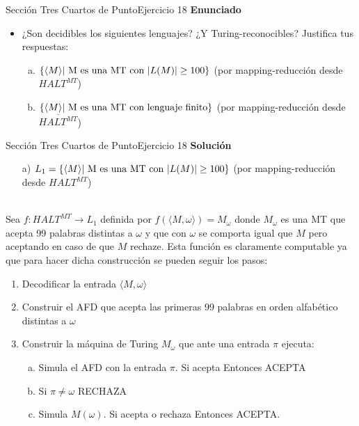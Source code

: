 \documentclass[10pt, envcountsect, presentation, aspectratio=169]{beamer}
\begin{document}

\begin{frame}{Sección Tres Cuartos de Punto}{Ejercicio 18}
    \textbf{Enunciado}
    \begin{itemize}
        \item ¿Son decidibles los siguientes lenguajes? ¿Y Turing-reconocibles? Justifica tus respuestas:
        \begin{enumerate}[a)]
            \item $\{\langle M \rangle \hbox{| M es una MT con } |L(M)| \geq 100\}$ (por mapping-reducción desde $HALT^{MT}$)
            \item $\{\langle M \rangle \hbox{| M es una MT con lenguaje finito}  \}$ (por mapping-reducción desde $\overline{HALT^{MT}}$)
        \end{enumerate}
    \end{itemize}
\end{frame}


\begin{frame}{Sección Tres Cuartos de Punto}{Ejercicio 18}
    \textbf{Solución}\\
    \begin{itemize}
        \item[a)] $L_1 = \{\langle M \rangle \hbox{| M es una MT con } |L(M)| \geq 100\}$ (por mapping-reducción desde $HALT^{MT}$)\\~\\
    \end{itemize}
    Sea $f: HALT^{MT} \rightarrow L_1$ definida por $f(\langle M, \omega \rangle) = M_{\omega}$ donde $M_{\omega}$ es una MT que acepta 99 palabras distintas a $\omega$ y que con $\omega$ se comporta igual que $M$ pero aceptando en caso de que $M$ rechaze.
    Esta función es claramente computable ya que para hacer dicha construcción se pueden seguir los pasos:
    \begin{enumerate}
        \item Decodificar la entrada $\langle M, \omega \rangle$
        \item Construir el AFD que acepta las primeras 99 palabras en orden alfabético distintas a $\omega$
        \item Construir la máquina de Turing $M_{\omega}$ que ante una entrada $\pi$ ejecuta:
        \begin{enumerate}[a)]
            \item Simula el AFD con la entrada $\pi$. Si acepta Entonces ACEPTA
            \item Si $\pi \neq \omega$ RECHAZA
            \item Simula $M(\omega)$. Si acepta o rechaza Entonces ACEPTA.
        \end{enumerate}
    \end{enumerate}  
\end{frame}
\end{document}
